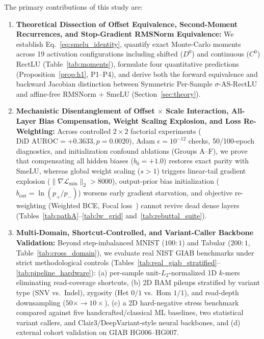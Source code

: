 \documentclass[10pt,a4paper]{article}
\begin{document}
The primary contributions of this study are:
\begin{enumerate}
    \item \textbf{Theoretical Dissection of Offset Equivalence, Second-Moment Recurrences, and Stop-Gradient RMSNorm Equivalence:} We establish Eq.~\eqref{eq:smelu_identity}, quantify exact Monte-Carlo moments across 19 activation configurations including shifted ($D^0$) and continuous ($C^0$) RectLU (Table~\ref{tab:moments}), formulate four quantitative predictions (Proposition~\ref{prop:h1}, P1--P4), and derive both the forward equivalence and backward Jacobian distinction between Symmetric Per-Sample $\sigma$-AS-RectLU and affine-free RMSNorm + SmeLU (Section~\ref{sec:theory}).
    \item \textbf{Mechanistic Disentanglement of Offset $\times$ Scale Interaction, All-Layer Bias Compensation, Weight Scaling Explosion, and Loss Re-Weighting:} Across controlled $2 \times 2$ factorial experiments ($\text{DiD AUROC} = +0.3633, p = 0.0020$), Adam $\epsilon = 10^{-12}$ checks, 50/100-epoch diagnostics, and initialization confound ablations (Groups A--F), we prove that compensating all hidden biases ($b_0 = +1.0$) restores exact parity with SmeLU, whereas global weight scaling ($s > 1$) triggers linear-tail gradient explosion ($\|\nabla \mathcal{L}_{\text{min}}\|_2 > 8000$), output-prior bias initialization ($b_{\text{out}} = \ln(p_+/p_-)$) worsens early gradient starvation, and objective re-weighting (Weighted BCE, Focal loss~\cite{lin2017}) cannot revive dead dense layers (Tables~\ref{tab:pathA}--\ref{tab:lw_grid} and~\ref{tab:rebuttal_suite}).
    \item \textbf{Multi-Domain, Shortcut-Controlled, and Variant-Caller Backbone Validation:} Beyond step-imbalanced MNIST ($100:1$) and Tabular ($200:1$, Table~\ref{tab:cross_domain}), we evaluate real NIST GIAB benchmarks under strict methodological controls (Tables~\ref{tab:real_giab_stratified}--\ref{tab:pipeline_hardware}): (a) per-sample unit-$L_2$-normalized 1D $k$-mers eliminating read-coverage shortcuts, (b) 2D BAM pileups stratified by variant type (SNV vs.\ Indel), zygosity (Het $0/1$ vs.\ Hom $1/1$), and read-depth downsampling ($50\times \to 10\times$), (c) a 2D hard-negative stress benchmark compared against five handcrafted/classical ML baselines, two statistical variant callers, and Clair3/DeepVariant-style neural backbones, and (d) external cohort validation on GIAB HG006--HG007.
\end{enumerate}

\end{document}
